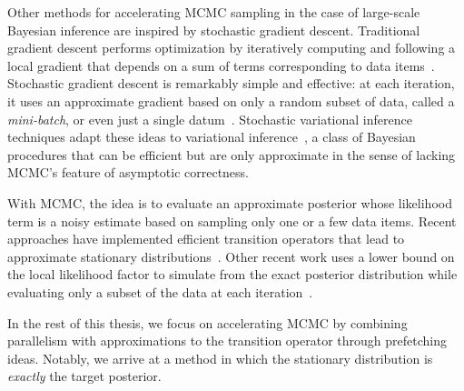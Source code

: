\documentclass[angelino.tex]{subfiles}
\begin{document}
Other methods for accelerating MCMC sampling in the case of large-scale
Bayesian inference are inspired by stochastic gradient descent.
Traditional gradient descent performs optimization by iteratively
computing and following a local gradient that depends on a sum of terms
corresponding to data items~\citep{optimization:1983-book}.
Stochastic gradient descent is remarkably simple and effective:
at each iteration, it uses an approximate gradient based on only a
random subset of data, called a \emph{mini-batch}, or even just a single 
datum~\citep{murata:1998-statistical}.
Stochastic variational inference techniques adapt these ideas to 
variational inference~\citep{hoffman:2013-svi}, a class of Bayesian 
procedures that can be efficient but are only approximate in the sense of
lacking MCMC's feature of asymptotic correctness.

With MCMC, the idea is to evaluate an approximate posterior whose likelihood
term is a noisy estimate based on sampling only one or a few data items.
Recent approaches have implemented efficient transition operators that
lead to approximate stationary distributions~\citep{welling-2011-langevin,welling-2012-fisher,korattikara-2014-austerity,bardenet:2014-subsampling,doucet-2014-likelihood-estimator}.
Other recent work uses a lower bound on the local likelihood factor to simulate
from the exact posterior distribution while evaluating only a subset of the data
at each iteration~\citep{maclaurin-2014-firefly}.

\bigskip

In the rest of this thesis, we focus on accelerating MCMC by combining
parallelism with approximations to the transition operator through
prefetching ideas.
Notably, we arrive at a method in which the stationary distribution is 
\emph{exactly} the target posterior.
\end{document}
